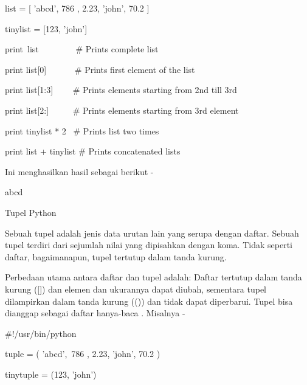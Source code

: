 \noindent 
list = [ 'abcd', 786 , 2.23, 'john', 70.2 ] \par
\noindent 
tinylist = [123, 'john'] \par
\vspace{12pt}
\noindent 
print~list~~~~~~~~   $  \#  $ Prints complete list \par
\noindent 
print list[0]~~~~~~  $  \#  $ Prints first element of the list \par
\noindent 
print list[1:3]~~~~  $  \#  $ Prints elements starting from 2nd till 3rd  \par
\noindent 
print list[2:]~~~~~  $  \#  $ Prints elements starting from 3rd element \par
\noindent 
print tinylist * 2~  $  \#  $ Prints list two times \par
\noindent 
print list + tinylist  $  \#  $ Prints concatenated lists \par
\noindent 
Ini menghasilkan hasil sebagai berikut - \par
{} \par
\noindent 
abcd \par
\noindent 
[786, 2.23] \par
\noindent 
[2.23, 'john', 70.200000000000003] \par
{} \par
{} \par
\noindent 
Tupel Python \par
\noindent 
Sebuah tupel adalah jenis data urutan lain yang serupa dengan daftar. $  $Sebuah tupel terdiri dari sejumlah nilai yang dipisahkan dengan koma. $  $Tidak seperti daftar, bagaimanapun, tupel tertutup dalam tanda kurung. \par
\noindent 
Perbedaan utama antara daftar dan tupel adalah: Daftar tertutup dalam tanda kurung ([]) dan elemen dan ukurannya dapat diubah, sementara tupel dilampirkan dalam tanda kurung (()) dan tidak dapat diperbarui. $  $Tupel bisa dianggap sebagai $  $daftar $  $hanya-baca $  $. $  $Misalnya - \par
\noindent 
 $  \#  $!/usr/bin/python \par
\vspace{12pt}
\noindent 
tuple = ( 'abcd',~786 , 2.23, 'john', 70.2  ) \par
\noindent 
tinytuple = (123, 'john') \par
\vspace{12pt}
